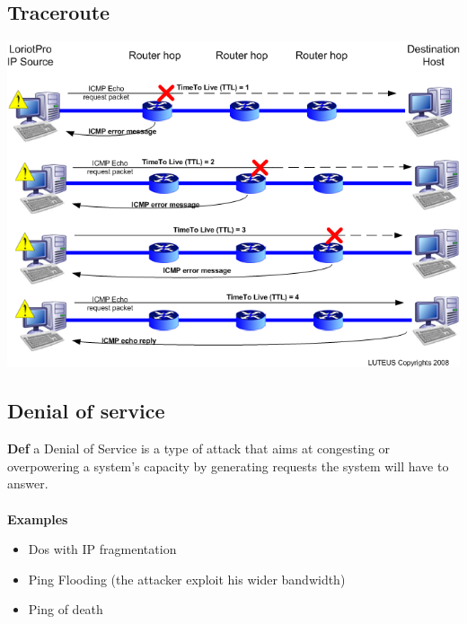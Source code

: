 \documentclass[10pt,a4paper]{article}
\begin{document}
\subsection{Traceroute}
\includegraphics[scale=0.5]{traceroute.png}
\newpage
\subsection{Denial of service}
\textbf{Def} a Denial of Service is a type of attack that aims at congesting or overpowering a system's capacity by generating requests the system will have to answer.\\\\
\textbf{Examples}
\begin{itemize}
\item Dos with IP fragmentation
\item Ping Flooding (the attacker exploit his wider bandwidth)
\item Ping of death
\end{itemize}
\end{document}
